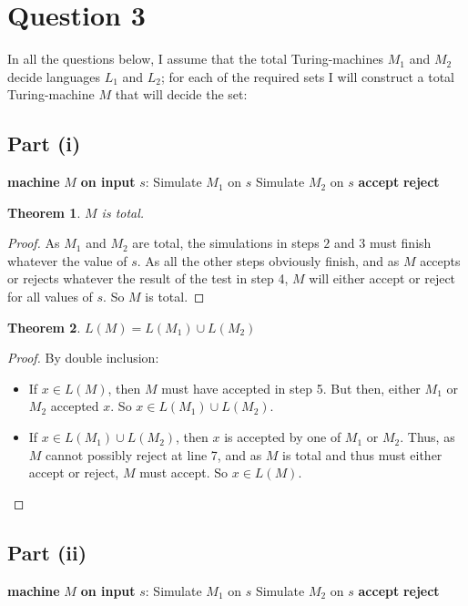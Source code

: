 \documentclass[a4paper,12pt]{scrartcl}
\newcommand{\Machine}[2]{\State \textbf{machine} #1 \textbf{on input} #2:}
\newcommand{\Reject}{\State \textbf{reject}}
\newcommand{\Accept}{\State \textbf{accept}}
\newtheorem{theorem}{Theorem}
\begin{document}
\section{Question 3}
In all the questions below, I assume that the total Turing-machines $M_1$ and $M_2$ decide languages $L_1$ and $L_2$; for each of the required sets I will construct a total Turing-machine $M$ that will decide the set:

\subsection{Part (i)}
\begin{algorithmic}[1]
    \Machine{$M$}{$s$}
    \State Simulate $M_1$ on $s$
    \State Simulate $M_2$ on $s$
        \Accept
    \Else
        \Reject
    \EndIf
\end{algorithmic}

\begin{theorem}
    $M$ is total.
\end{theorem}
\begin{proof}
    As $M_1$ and $M_2$ are total, the simulations in steps $2$ and $3$ must finish whatever the value of $s$. As all the other steps obviously finish, and as $M$ accepts or rejects whatever the result of the test in step 4, $M$ will either accept or reject for all values of $s$. So $M$ is total.
\end{proof}

\begin{theorem}
    $L(M) = L(M_1) \cup L(M_2)$
\end{theorem}
\begin{proof}
    By double inclusion:
    \begin{itemize}
        \item If $x \in L(M)$, then $M$ must have accepted in step 5. But then, either $M_1$ or $M_2$ accepted $x$. So $x \in L(M_1) \cup L(M_2)$.
        \item If $x \in L(M_1) \cup L(M_2)$, then $x$ is accepted by one of $M_1$ or $M_2$. Thus, as $M$ cannot possibly reject at line 7, and as $M$ is total and thus must either accept or reject, $M$ must accept. So $x \in L(M)$.
    \end{itemize}
\end{proof}

\subsection{Part (ii)}
\begin{algorithmic}[1]
    \Machine{$M$}{$s$}
    \State Simulate $M_1$ on $s$
    \State Simulate $M_2$ on $s$
        \Accept
    \Else
        \Reject
    \EndIf
\end{algorithmic}
\end{document}
